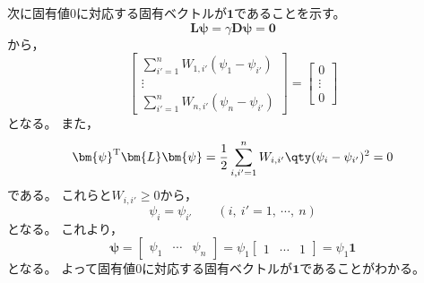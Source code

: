 \documentclass[class=jsarticle, crop=false, dvipdfmx, fleqn]{standalone}
\begin{document}
次に固有値\(0\)に対応する固有ベクトルが\(\bm{1}\)であることを示す。
\begin{equation}
    \bm{L} \bm{\psi} = \gamma \bm{D} \bm{\psi} = \bm{0}
\end{equation}
から，
\begin{equation}
    \begin{bmatrix}
        \sum_{i'=1}^{n} W_{1, i'} (\psi_1 - \psi_{i'}) \\
        \vdots \\
        \sum_{i'=1}^{n} W_{n, i'} (\psi_n - \psi_{i'})
    \end{bmatrix}
    =
    \begin{bmatrix}
        0 \\
        \vdots \\
        0
    \end{bmatrix}
\end{equation}
となる。
また，
\begin{equation}
    \bm{\psi}^\mathrm{T} \bm{L} \bm{\psi} = \frac{1}{2} \sum_{i, i' = 1}^{n} W_{i, i'} \qty(\psi_i - \psi_{i'})^2 = 0
\end{equation}
である。
これらと\(W_{i, i'} \ge 0\)から，
\begin{equation}
    \psi_i = \psi_{i'} \qquad (i,\ i' = 1,\ \cdots,\ n)
\end{equation}
となる。
これより，
\begin{equation}
    \bm{\psi} =
        \begin{bmatrix}
            \psi_1 & \cdots & \psi_n
        \end{bmatrix}
        =
        \psi_1
        \begin{bmatrix}
            1 & \cdots & 1
        \end{bmatrix}
        = \psi_1 \bm{1}
\end{equation}
となる。
よって固有値\(0\)に対応する固有ベクトルが\(\bm{1}\)であることがわかる。
\end{document}
